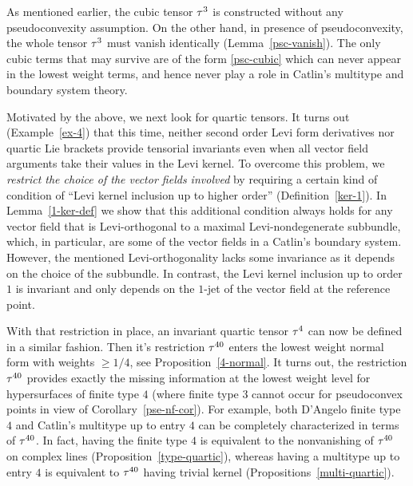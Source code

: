 \documentclass[12pt]{amsart}
\begin{document}
As mentioned earlier, the cubic tensor $\tau^3$ is constructed without any pseudoconvexity assumption.
On the other hand, in presence of pseudoconvexity,
the whole tensor $\tau^3$
must vanish identically (Lemma~\ref{psc-vanish}).
The only cubic terms that may survive are of the form \eqref{psc-cubic}
which can never appear in the lowest weight terms,
and hence never play a role in Catlin's multitype 
and boundary system theory.  

Motivated by the above, we next look for quartic tensors.
It turns out (Example~\ref{ex-4}) 
that this time, neither second order Levi form derivatives
nor quartic Lie brackets provide tensorial invariants
even when all vector field arguments take their values in the Levi kernel.
To overcome this problem, we {\em restrict the choice of 
the vector fields involved} by requiring a certain kind of condition of
 ``Levi kernel inclusion up to higher order'' (Definition~\ref{ker-1}).
 In Lemma~\ref{1-ker-def} we show that
this additional condition always holds
for any vector field that is Levi-orthogonal
to a maximal Levi-nondegenerate subbundle,
which, in particular, are some of the vector fields 
in a Catlin's boundary system.
However, the mentioned Levi-orthogonality lacks some invariance
as it depends on the choice of the subbundle.
In contrast, the Levi kernel inclusion up to order $1$
is invariant and only depends
on the $1$-jet of the vector field at the reference point.


With that restriction in place, an invariant quartic tensor $\tau^4$
can now be defined in a similar fashion.
Then
it's restriction $\tau^{40}$ enters 
the lowest weight normal form 
with weights $\ge 1/4$,
see Proposition~\ref{4-normal}.
It turns out, the restriction $\tau^{40}$ 
provides exactly the missing information 
at the lowest weight level for hypersurfaces of finite type $4$
(where finite type $3$ cannot occur for pseudoconvex points in view of
Corollary~\ref{pse-nf-cor}).
For example, both D'Angelo finite type $4$
and Catlin's multitype up to entry $4$
can be completely characterized in terms
of $\tau^{40}$.
In fact, having the finite type $4$ is equivalent
to the nonvanishing of $\tau^{40}$ on complex lines
(Proposition~\ref{type-quartic}),
whereas having a multitype up to entry $4$
is equivalent to $\tau^{40}$ having trivial kernel
(Propositions~\ref{multi-quartic}).
\end{document}
